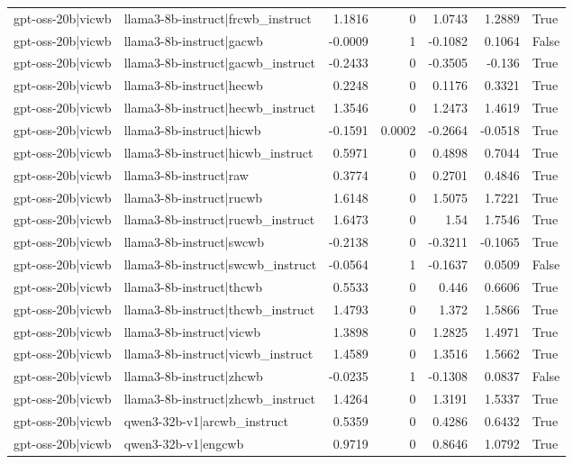 \begin{table}
\begin{tabular}{l l r r r r l}
gpt-oss-20b|vicwb & llama3-8b-instruct|frcwb_instruct & 1.1816 & 0 & 1.0743 & 1.2889 & True \\
gpt-oss-20b|vicwb & llama3-8b-instruct|gacwb & -0.0009 & 1 & -0.1082 & 0.1064 & False \\
gpt-oss-20b|vicwb & llama3-8b-instruct|gacwb_instruct & -0.2433 & 0 & -0.3505 & -0.136 & True \\
gpt-oss-20b|vicwb & llama3-8b-instruct|hecwb & 0.2248 & 0 & 0.1176 & 0.3321 & True \\
gpt-oss-20b|vicwb & llama3-8b-instruct|hecwb_instruct & 1.3546 & 0 & 1.2473 & 1.4619 & True \\
gpt-oss-20b|vicwb & llama3-8b-instruct|hicwb & -0.1591 & 0.0002 & -0.2664 & -0.0518 & True \\
gpt-oss-20b|vicwb & llama3-8b-instruct|hicwb_instruct & 0.5971 & 0 & 0.4898 & 0.7044 & True \\
gpt-oss-20b|vicwb & llama3-8b-instruct|raw & 0.3774 & 0 & 0.2701 & 0.4846 & True \\
gpt-oss-20b|vicwb & llama3-8b-instruct|rucwb & 1.6148 & 0 & 1.5075 & 1.7221 & True \\
gpt-oss-20b|vicwb & llama3-8b-instruct|rucwb_instruct & 1.6473 & 0 & 1.54 & 1.7546 & True \\
gpt-oss-20b|vicwb & llama3-8b-instruct|swcwb & -0.2138 & 0 & -0.3211 & -0.1065 & True \\
gpt-oss-20b|vicwb & llama3-8b-instruct|swcwb_instruct & -0.0564 & 1 & -0.1637 & 0.0509 & False \\
gpt-oss-20b|vicwb & llama3-8b-instruct|thcwb & 0.5533 & 0 & 0.446 & 0.6606 & True \\
gpt-oss-20b|vicwb & llama3-8b-instruct|thcwb_instruct & 1.4793 & 0 & 1.372 & 1.5866 & True \\
gpt-oss-20b|vicwb & llama3-8b-instruct|vicwb & 1.3898 & 0 & 1.2825 & 1.4971 & True \\
gpt-oss-20b|vicwb & llama3-8b-instruct|vicwb_instruct & 1.4589 & 0 & 1.3516 & 1.5662 & True \\
gpt-oss-20b|vicwb & llama3-8b-instruct|zhcwb & -0.0235 & 1 & -0.1308 & 0.0837 & False \\
gpt-oss-20b|vicwb & llama3-8b-instruct|zhcwb_instruct & 1.4264 & 0 & 1.3191 & 1.5337 & True \\
gpt-oss-20b|vicwb & qwen3-32b-v1|arcwb_instruct & 0.5359 & 0 & 0.4286 & 0.6432 & True \\
gpt-oss-20b|vicwb & qwen3-32b-v1|engcwb & 0.9719 & 0 & 0.8646 & 1.0792 & True \\

\end{tabular}
\end{table}
